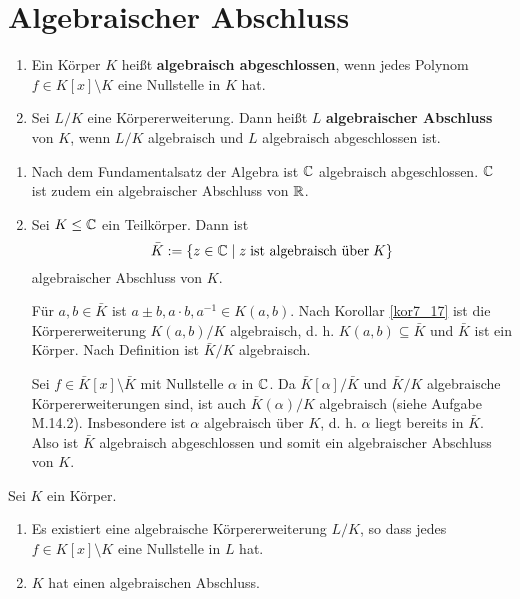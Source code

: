 \section{Algebraischer Abschluss}
\begin{definition}
	\begin{enumerate}[label=(\alph*)]
		\item Ein Körper $K$ heißt \textbf{algebraisch abgeschlossen}, wenn jedes Polynom $f \in K[x] \setminus K$ eine Nullstelle in $K$ hat.
		\item Sei $L/K$ eine Körpererweiterung. Dann heißt $L$ \textbf{algebraischer Abschluss} von $K$, wenn $L/K$ algebraisch und $L$ algebraisch abgeschlossen ist.
	\end{enumerate}
\end{definition}
\begin{beispiel}\label{beispiel8_2}
	\begin{enumerate}[label=(\arabic*)]
		\item Nach dem Fundamentalsatz der Algebra ist $\mathbb{C}$ algebraisch abgeschlossen. $\mathbb{C}$ ist zudem ein algebraischer Abschluss von $\mathbb{R}$.
		\item Sei $K \leq \mathbb{C}$ ein Teilkörper. Dann ist 
		\[\bar{K} := \{z \in \mathbb{C} \mid z \; \text{ist algebraisch über} \; K\}\]
		algebraischer Abschluss von $K$.
		\begin{inlproof}
			Für $a,b \in \bar{K}$ ist $a \pm b, a \cdot b, a^{-1} \in K(a,b)$. Nach Korollar \ref{kor7_17} ist die Körpererweiterung $K(a,b)/K$ algebraisch, d. h. $K(a,b) \subseteq \bar{K}$ und $\bar{K}$ ist ein Körper. Nach Definition ist $\bar{K} / K$ algebraisch. 
			
			Sei $f \in \bar{K}[x] \setminus \bar{K}$ mit Nullstelle $\alpha$ in $\mathbb{C}$. Da $\bar{K}[\alpha] / \bar{K}$ und $\bar{K}/K$ algebraische Körpererweiterungen sind, ist auch $\bar{K}(\alpha) /K$ algebraisch (siehe Aufgabe M.14.2). Insbesondere ist $\alpha$ algebraisch über $K$, d. h. $\alpha$ liegt bereits in $\bar{K}$. Also ist $\bar{K}$ algebraisch abgeschlossen und somit ein algebraischer Abschluss von $K$.
		\end{inlproof}
	\end{enumerate}
\end{beispiel}
\begin{thm}\label{thm8_3}
	Sei $K$ ein Körper.
	\begin{enumerate}[label=(\alph*)]
		\item Es existiert eine algebraische Körpererweiterung $L/K$, so dass jedes $f \in K[x] \setminus K$ eine Nullstelle in $L$ hat.
		\item $K$ hat einen algebraischen Abschluss. 
	\end{enumerate}
\end{thm}
